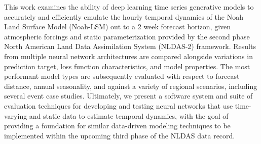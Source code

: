 This work examines the ability of deep learning time series generative models to accurately and efficiently emulate the hourly temporal dynamics of the Noah Land Surface Model (Noah-LSM) out to a 2 week forecast horizon, given atmospheric forcings and static parameterization provided by the second phase North American Land Data Assimilation System (NLDAS-2) framework. Results from multiple neural network architectures are compared alongside variations in prediction target, loss function characteristics, and model properties. The most performant model types are subsequently evaluated with respect to forecast distance, annual seasonality, and against a variety of regional scenarios, including several event case studies. Ultimately, we present a software system and suite of evaluation techniques for developing and testing neural networks that use time-varying and static data to estimate temporal dynamics, with the goal of providing a foundation for similar data-driven modeling techniques to be implemented within the upcoming third phase of the NLDAS data record.

\clearpage

